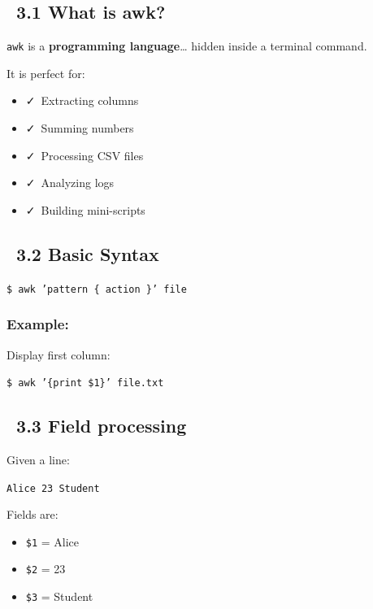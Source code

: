 \documentclass[12pt]{article}
\newcommand{\brainicon}{\faBrain}
\newcommand{\targeticon}{\faBullseye}
\newcommand{\crownicon}{\faCrown}
\newcommand{\checkicon}{\faCheck}
\begin{document}
\subsection*{\crownicon\ 3.1 What is awk?}

\texttt{awk} is a \textbf{programming language}… hidden inside a terminal command.

It is perfect for:

\begin{itemize}
    \item \checkicon\ Extracting columns
    \item \checkicon\ Summing numbers
    \item \checkicon\ Processing CSV files
    \item \checkicon\ Analyzing logs
    \item \checkicon\ Building mini-scripts
\end{itemize}

\subsection*{\brainicon\ 3.2 Basic Syntax}

\begin{highlightbox}
\texttt{\$ awk 'pattern \{ action \}' file}
\end{highlightbox}

\subsubsection*{Example:}

Display first column:

\begin{highlightbox}
\texttt{\$ awk '\{print \$1\}' file.txt}
\end{highlightbox}

\subsection*{\targeticon\ 3.3 Field processing}

Given a line:

\begin{highlightbox}
\texttt{Alice 23 Student}
\end{highlightbox}

Fields are:

\begin{itemize}
    \item \texttt{\$1} = Alice
    \item \texttt{\$2} = 23
    \item \texttt{\$3} = Student
\end{itemize}
\end{document}
